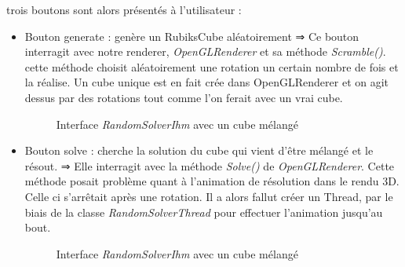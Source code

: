 trois boutons sont alors présentés à l'utilisateur :
\begin{itemize}
 	\item Bouton generate : genère un RubiksCube aléatoirement 
	    ⇒ Ce bouton interragit avec notre renderer, \textit{OpenGLRenderer} et sa méthode \textit{Scramble()}. cette méthode choisit aléatoirement une rotation un certain nombre de fois et la réalise.
Un cube unique est en fait crée dans OpenGLRenderer et on agit dessus par des rotations tout comme l'on ferait avec un vrai cube.

\begin{figure}[h]
\begin{center}
\end{center}
	\caption{Interface  \textit{RandomSolverIhm} avec un cube mélangé}
\end{figure}

	\item Bouton solve : cherche la solution du cube qui vient d'être mélangé et le résout.
	   ⇒  Elle interragit avec la méthode \textit{Solve()} de \textit{OpenGLRenderer}. Cette méthode posait problème quant à l'animation de résolution dans le rendu 3D. Celle ci s'arrêtait après une rotation. Il a alors
fallut créer un Thread,  par le biais de la classe \textit{RandomSolverThread} pour effectuer l'animation jusqu'au bout.
\begin{figure}[h]
\begin{center}
\end{center}
	\caption{Interface  \textit{RandomSolverIhm} avec un cube mélangé}
\end{figure}


\end{itemize}
